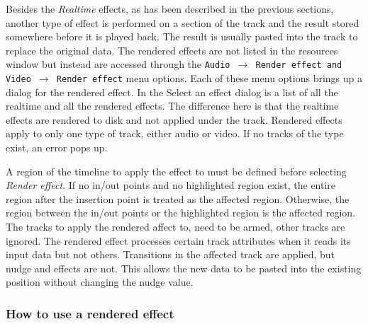 Besides the \textit{Realtime} effects, as has been described in the previous sections, another type of effect is performed on a section of the track and the result stored somewhere before it is played back. The result is usually pasted into the track to replace the original data. The rendered effects are not listed in the resources window but instead are accessed through the \texttt{Audio $\rightarrow$ Render effect and Video $\rightarrow$ Render effect} menu options. Each of these menu options brings up a dialog for the rendered effect. In the Select an effect dialog is a list of all the realtime and all the rendered effects. The difference here is that the realtime effects are rendered to disk and not applied under the track. Rendered effects apply to only one type of track, either audio or video. If no tracks of the type exist, an error pops up.

A region of the timeline to apply the effect to must be defined before selecting \textit{Render effect}. If no in/out points and no highlighted region exist, the entire region after the insertion point is treated as the affected region. Otherwise, the region between the in/out points or the highlighted region is the affected region. The tracks to apply the rendered affect to, need to be armed, other tracks are ignored. The rendered effect processes certain track attributes when it reads its input data but not others. Transitions in the affected track are applied, but nudge and effects are not. This allows the new data to be pasted into the existing position without changing the nudge value.

\subsubsection*{How to use a rendered effect}%
\label{ssub:how_use_rendered_effect}


